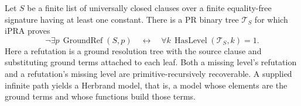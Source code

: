 \begin{theorem}\label{thm:herbrandtree}
Let $S$ be a finite list of universally closed clauses over a finite equality-free signature having at least one constant. There is a PR binary tree $\mathcal T_S$ for which iPRA proves
\[
 \neg\exists p\,\operatorname{GroundRef}(S,p)
 \quad\longleftrightarrow\quad
 \forall k\,\operatorname{HasLevel}(\mathcal T_S,k)=1 .
\]
Here a refutation is a ground resolution tree with the source clause and substituting ground terms attached to each leaf. Both a missing level's refutation and a refutation's missing level are primitive-recursively recoverable. A supplied infinite path yields a Herbrand model, that is, a model whose elements are the ground terms and whose functions build those terms.
\end{theorem}
